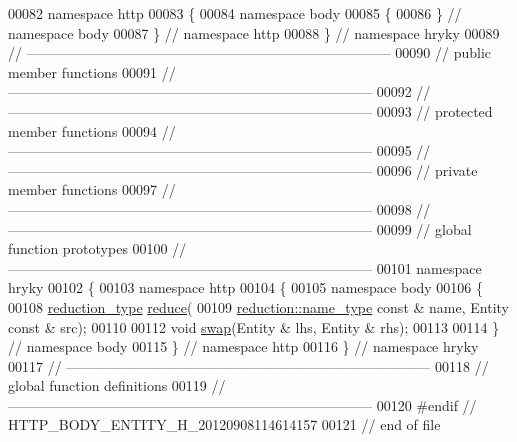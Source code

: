 \begin{DoxyCode}
00082 \textcolor{keyword}{namespace }http
00083 \{
00084 \textcolor{keyword}{namespace }body
00085 \{
00086 \} \textcolor{comment}{// namespace body}
00087 \} \textcolor{comment}{// namespace http}
00088 \} \textcolor{comment}{// namespace hryky}
00089 \textcolor{comment}{//
      ------------------------------------------------------------------------------}
00090 \textcolor{comment}{// public member functions}
00091 \textcolor{comment}{//
      ------------------------------------------------------------------------------}
00092 \textcolor{comment}{//
      ------------------------------------------------------------------------------}
00093 \textcolor{comment}{// protected member functions}
00094 \textcolor{comment}{//
      ------------------------------------------------------------------------------}
00095 \textcolor{comment}{//
      ------------------------------------------------------------------------------}
00096 \textcolor{comment}{// private member functions}
00097 \textcolor{comment}{//
      ------------------------------------------------------------------------------}
00098 \textcolor{comment}{//
      ------------------------------------------------------------------------------}
00099 \textcolor{comment}{// global function prototypes}
00100 \textcolor{comment}{//
      ------------------------------------------------------------------------------}
00101 \textcolor{keyword}{namespace }hryky
00102 \{
00103 \textcolor{keyword}{namespace }http
00104 \{
00105 \textcolor{keyword}{namespace }body
00106 \{
00108     \hyperlink{namespacehryky_a343a9a4c36a586be5c2693156200eadc}{reduction_type} \hyperlink{namespacehryky_1_1http_a08fc36a78a8e2908140fcd102829a566}{reduce}(
00109         \hyperlink{namespacehryky_1_1reduction_ac686c30a4c8d196bbd0f05629a6b921f}{reduction::name_type} \textcolor{keyword}{const} & name, Entity \textcolor{keyword}{const} & src);
00110 
00112     \textcolor{keywordtype}{void} \hyperlink{namespacehryky_1_1http_a38e62595ad532d18fbc65ceb61973aec}{swap}(Entity & lhs, Entity & rhs);
00113 
00114 \} \textcolor{comment}{// namespace body}
00115 \} \textcolor{comment}{// namespace http}
00116 \} \textcolor{comment}{// namespace hryky}
00117 \textcolor{comment}{//
      ------------------------------------------------------------------------------}
00118 \textcolor{comment}{// global function definitions}
00119 \textcolor{comment}{//
      ------------------------------------------------------------------------------}
00120 \textcolor{preprocessor}{#endif // HTTP\_BODY\_ENTITY\_H\_20120908114614157}
00121 \textcolor{preprocessor}{}\textcolor{comment}{// end of file}
\end{DoxyCode}
